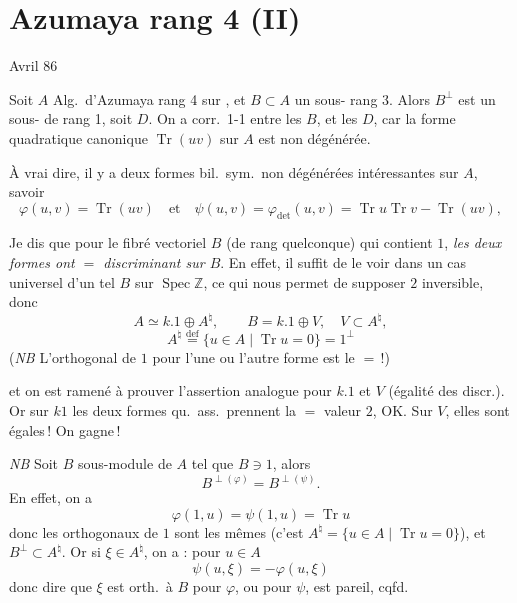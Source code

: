 \documentclass[11pt,a4paper]{article}
\begin{document}
\section{Azumaya rang 4 (II)}


Avril 86

Soit $A$ Alg.\ d'Azumaya rang 4 sur  , et $B\subset A$ un sous-  rang 3. Alors $B^{\perp}$ est un sous-  de rang 1, soit $D$. On a corr.\ 1-1 entre les $B$, et les $D$, car la forme quadratique canonique $\operatorname{Tr}(uv)$ sur $A$ est non dégénérée.

À vrai dire, il y a deux formes bil.\ sym.\ non dégénérées intéressantes sur $A$, savoir
\[
\varphi(u,v)=\operatorname{Tr}(uv) \quad\text{et}\quad \psi(u,v)=\varphi_{\det}(u,v)=\operatorname{Tr}u\operatorname{Tr}v-\operatorname{Tr}(uv),
\]

Je dis que pour le fibré vectoriel $B$ (de rang quelconque) qui contient $1$, \emph{les deux formes ont $=$ discriminant sur $B$}. En effet, il suffit de le voir dans un cas universel d'un tel $B$ sur $\operatorname{Spec}\mathbb{Z}$, ce qui nous permet de supposer $2$ inversible, donc
\[
A\simeq k.1\oplus A^{\natural}, \qquad B=k.1\oplus V,\quad V\subset A^{\natural},
\]
\[
A^{\natural}\overset{\mathrm{def}}{=}\{u\in A \mid \operatorname{Tr}u=0\} = 1^{\perp}
\]
(\emph{NB} L'orthogonal de $1$ pour l'une ou l'autre forme est le $=$\,!)

et \struck{$\xi$} on est ramené à prouver l'assertion  analogue pour $k.1$ et $V$ (égalité des discr.). Or sur $k1$ les deux formes  qu.\ ass.\ prennent la $=$ valeur $2$, OK. Sur $V$,  elles sont égales\,! On gagne\,!


\emph{NB} Soit $B$ sous-module de $A$ tel que $B\ni 1$, alors
\[
B^{\perp(\varphi)}=B^{\perp(\psi)} .
\]
En effet,  on a
\[
\varphi(1,u)=\psi(1,u)=\operatorname{Tr}u
\]
donc les orthogonaux de $1$ sont les mêmes (c'est $A^{\natural}=\{u\in A\mid \operatorname{Tr}u=0\}$), et $B^{\perp}\subset A^{\natural}$. Or si $\xi\in A^{\natural}$, on a : pour  $u\in A$
\[
\psi(u,\xi)=-\varphi(u,\xi)
\]
donc dire que $\xi$ est orth.\ à $B$ pour $\varphi$, ou pour $\psi$, est pareil, cqfd.
\end{document}
